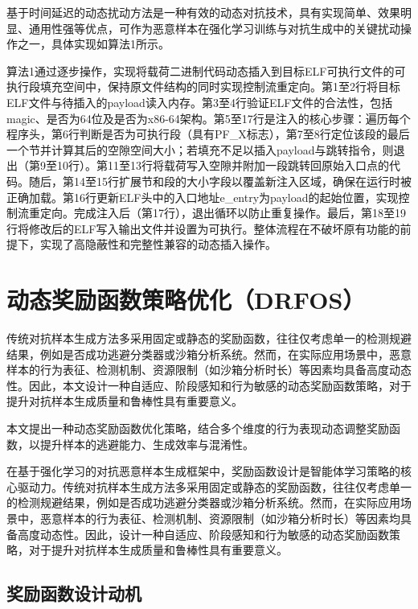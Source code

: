 基于时间延迟的动态扰动方法是一种有效的动态对抗技术，具有实现简单、效果明显、通用性强等优点，可作为恶意样本在强化学习训练与对抗生成中的关键扰动操作之一，具体实现如算法1所示。


算法1通过逐步操作，实现将载荷二进制代码动态插入到目标ELF可执行文件的可执行段填充空间中，保持原文件结构的同时实现控制流重定向。第1至2行将目标ELF文件与待插入的payload读入内存。第3至4行验证ELF文件的合法性，包括magic、是否为64位及是否为x86-64架构。第5至17行是注入的核心步骤：遍历每个程序头，第6行判断是否为可执行段（具有PF\_X标志），第7至8行定位该段的最后一个节并计算其后的空隙空间大小；若填充不足以插入payload与跳转指令，则退出（第9至10行）。第11至13行将载荷写入空隙并附加一段跳转回原始入口点的代码。随后，第14至15行扩展节和段的大小字段以覆盖新注入区域，确保在运行时被正确加载。第16行更新ELF头中的入口地址e\_entry为payload的起始位置，实现控制流重定向。完成注入后（第17行），退出循环以防止重复操作。最后，第18至19行将修改后的ELF写入输出文件并设置为可执行。整体流程在不破坏原有功能的前提下，实现了高隐蔽性和完整性兼容的动态插入操作。




\section{动态奖励函数策略优化（DRFOS）}

传统对抗样本生成方法多采用固定或静态的奖励函数，往往仅考虑单一的检测规避结果，例如是否成功逃避分类器或沙箱分析系统\cite{anderson2018learning}。然而，在实际应用场景中，恶意样本的行为表征、检测机制、资源限制（如沙箱分析时长）等因素均具备高度动态性。因此，本文设计一种自适应、阶段感知和行为敏感的动态奖励函数策略，对于提升对抗样本生成质量和鲁棒性具有重要意义。

本文提出一种动态奖励函数优化策略，结合多个维度的行为表现动态调整奖励函数，以提升样本的逃避能力、生成效率与混淆性。

在基于强化学习的对抗恶意样本生成框架中，奖励函数设计是智能体学习策略的核心驱动力。传统对抗样本生成方法多采用固定或静态的奖励函数，往往仅考虑单一的检测规避结果，例如是否成功逃避分类器或沙箱分析系统。然而，在实际应用场景中，恶意样本的行为表征、检测机制、资源限制（如沙箱分析时长）等因素均具备高度动态性。因此，设计一种自适应、阶段感知和行为敏感的动态奖励函数策略，对于提升对抗样本生成质量和鲁棒性具有重要意义。

\subsection{奖励函数设计动机}

